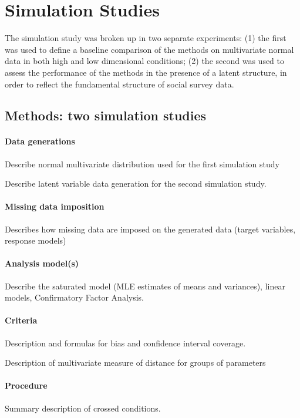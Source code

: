 \maketitle
\section{Simulation Studies}

The simulation study was broken up in two separate experiments: (1) the first was used to define a baseline comparison 
of the methods on multivariate normal data in both high and low dimensional conditions; (2) the second was used to 
assess the performance of the methods in the presence of a latent structure, in order to reflect the fundamental
structure of social survey data.

\subsection{Methods: two simulation studies}

\paragraph{Data generations}
	Describe normal multivariate distribution used for the first simulation study 

	Describe latent variable data generation for the second simulation study.

\paragraph{Missing data imposition}
	Describes how missing data are imposed on the generated data (target variables, response models)

\paragraph{Analysis model(s)}
	Describe the saturated model (MLE estimates of means and variances), linear models, 
	Confirmatory Factor Analysis.

\paragraph{Criteria}
	Description and formulas for bias and confidence interval coverage.

	Description of multivariate measure of distance for groups of parameters

\paragraph{Procedure}
	Summary description of crossed conditions.

